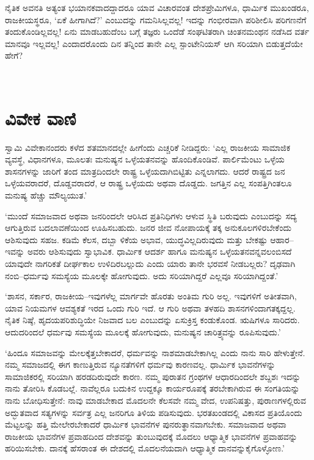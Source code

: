 ನೈತಿಕ ಅವನತಿ ಅತ್ಯಂತ ಭಯಾನಕವಾದದ್ದಾದರೂ ಯಾವ ವಿಚಾರವಂತ ದೇಶಪ್ರೇಮಿಗಳೂ, ಧಾರ್ಮಿಕ ಮುಖಂಡರೂ, ರಾಜಕೀಯಸ್ಥರೂ, ‘ಏಕೆ ಹೀಗಾಗಿದೆ?’ ಎಂಬುದನ್ನು ಗಮನಿ\-ಸಿಲ್ಲ\-ವಲ್ಲ! ಇದನ್ನು ಗಂಭೀರವಾಗಿ ಪರಿಶೀಲಿಸಿ ಪರಿಗಣನೆಗೆ ತಂದುಕೊಂಡಿಲ್ಲವಲ್ಲ! ಏನು ಮಾಡ\-ಬಹುದೆಂಬ ಬಗ್ಗೆ ತಜ್ಞರು ಒಂದೆಡೆ ಸಂಘಟಿತರಾಗಿ ಚಿಂತನಮಂಥನ ನಡೆಸಿದ ವರ್ತ ಮಾನವೂ ಇಲ್ಲವಲ್ಲ! ಎಂದಾದರೊಂದು ದಿನ ತನ್ನಿಂದ ತಾನೇ ಎಲ್ಲ ಸ್ಪಾಂಟೇನಿಯಸ್ ಆಗಿ ಸರಿಯಾಗಿ ಬಿಡುತ್ತದೆಯೇ ಹೇಗೆ?

~\\[-1.45cm]


\section*{ವಿವೇಕ ವಾಣಿ}

\vskip -6pt

ಸ್ವಾಮಿ ವಿವೇಕಾನಂದರು ಕಳೆದ ಶತಮಾನದಲ್ಲೇ ಹೀಗೆಂದು ಎಚ್ಚರಿಕೆ ನೀಡಿದ್ದರು: ‘ಎಲ್ಲ ರಾಜ\-ಕೀಯ ಸಾಮಾಜಿಕ ವ್ಯವಸ್ಥೆ, ವಿಧಾನಗಳೂ, ಮೂಲತಃ ಮನುಷ್ಯನ ಒಳ್ಳೆಯತನವನ್ನು ಹೊಂದಿ\-ಕೊಂಡಿವೆ. ಪಾರ್ಲಿಮೆಂಟು ಒಳ್ಳೆಯ ಶಾಸನಗಳನ್ನು ಜಾರಿಗೆ ತಂದ ಮಾತ್ರದಿಂದಲೇ ರಾಷ್ಟ್ರ ಒಳ್ಳೆಯದಾಗಿಬಿಟ್ಟಿತು ಎನ್ನಲಾಗದು. ಆದರೆ ರಾಷ್ಟ್ರದ ಜನ ಒಳ್ಳೆಯವರಾದರೆ, ದೊಡ್ಡವ\-ರಾದರೆ, ಆ ರಾಷ್ಟ್ರ ಒಳ್ಳೆಯದು ಅಥವಾ ದೊಡ್ಡದು. ಜಗತ್ತಿನ ಎಲ್ಲ ಸಂಪತ್ತಿಗಿಂತಲೂ ಮನುಷ್ಯ ಹೆಚ್ಚು ಮೌಲ್ಯಯುತ.’

‘ಮುಂದೆ ಸಮಾಜವಾದ ಅಥವಾ ಜನರಿಂದಲೇ ಆರಿಸಿದ ಪ್ರತಿನಿಧಿಗಳು ಆಳುವ ಸ್ಥಿತಿ ಬರುವುದು ಎಂಬುದನ್ನು ಸದ್ಯ ಆಗುತ್ತಿರುವ ಬದಲಾವಣೆಯಿಂದ ಊಹಿಸಬಹುದು. ಜನರ ಜೀವ ನೋಪಾಯಕ್ಕೆ ತಕ್ಕ ಅನುಕೂಲಗಳಿರಬೇಕೆಂದು ಆಶಿಸುವುದು ಸಹಜ. ಕಡಿಮೆ ಕೆಲಸ, ದಬ್ಬಾ ಳಿಕೆಯ ಅಭಾವ, ಯುದ್ಧವಿಲ್ಲದಿರುವುದು ಮತ್ತು ಬೇಕಷ್ಟು ಆಹಾರ–ಇವನ್ನು ಅವರು ಆಶಿಸುವುದು ಸ್ವಾಭಾವಿಕ. ಧಾರ್ಮಿಕ ಆದರ್ಶ ಹಾಗೂ ಮನುಷ್ಯನ ಒಳ್ಳೆಯತನವನ್ನವಲಂಬಿಸದೆ ಯಾವುದೇ ನಾಗರಿಕತೆ ದೀರ್ಘಕಾಲ ಉಳಿದಿರಬಲ್ಲುದು ಎಂದು ಯಾರು ತಾನೇ ಭರವಸೆ ನೀಡಬಲ್ಲರು? ದೃಢವಾಗಿ ನಂಬಿ–ಧರ್ಮವು ಸಮಸ್ಯೆಯ ಮೂಲಕ್ಕೇ ಹೋಗುವುದು. ಅದು ಸರಿಯಾಗಿದ್ದರೆ ಎಲ್ಲವೂ ಸರಿಯಾಗಿದ್ದಂತೆ.’

‘ಶಾಸನ, ಸರ್ಕಾರ, ರಾಜಕೀಯ–ಇವುಗಳೆಲ್ಲ ಮಾರ್ಗವೇ ಹೊರತು ಅಂತಿಮ ಗುರಿ ಅಲ್ಲ. ಇವುಗಳಿಗೆ ಅತೀತವಾಗಿ, ಯಾವ ನಿಯಮಗಳ ಆವಶ್ಯಕತೆ ಇರದ ಒಂದು ಗುರಿ ಇದೆ. ಆ ಗುರಿ ಅಥವಾ ತಳಹದಿ ಶಾಸನಗಳಿಂದಾಗತಕ್ಕದ್ದಲ್ಲ. ನೈತಿಕ ನಿಷ್ಠೆ, ಹೃದಯಪರಿಶುದ್ಧಿಯೇ ನಿಜವಾದ ಬಲ ಎಂಬುದನ್ನು ಏಸುಕ್ರಿಸ್ತ ಕಂಡುಕೊಂಡ. ಋಷಿಗಳೂ ಸಾರಿದರು. ಆದುದರಿಂದಲೆ ಧರ್ಮವು ಸಮಸ್ಯೆಯ ಮೂಲಕ್ಕೆ ಹೋಗುವುದು, ಮನುಷ್ಯನ ಚಾರಿತ್ರ್ಯವನ್ನು ರೂಪಿಸುವುದು.’

‘ಹಿಂದೂ ಸಮಾಜವನ್ನು ಮೇಲಕ್ಕೆತ್ತಬೇಕಾದರೆ, ಧರ್ಮವನ್ನು ನಾಶಮಾಡಬೇಕಾಗಿಲ್ಲ ಎಂದು ನಾನು ಸಾರಿ ಹೇಳುತ್ತೇನೆ. ನಮ್ಮ ಸಮಾಜದಲ್ಲಿ ಈಗ ಕಾಣುತ್ತಿರುವ ನ್ಯೂನತೆಗಳಿಗೆ ಧರ್ಮವು ಕಾರಣವಲ್ಲ. ಧಾರ್ಮಿಕ ಭಾವನೆಗಳನ್ನು ಸಾಮಾಜಿಕರಲ್ಲಿ ಸರಿಯಾಗಿ ಹರಡದಿರುವುದೇ ಕಾರಣ. ನಮ್ಮ ಪುರಾತನ ಗ್ರಂಥಗಳ ಆಧಾರದಿಂದಲೇ ಶಬ್ದಶಃ ಇದನ್ನು ನಾನು ತೋರಿಸಿ ಕೊಡಬಲ್ಲೆ. ನಾವೆಲ್ಲರೂ ಬದುಕಿನ ಉದ್ದಕ್ಕೂ ಕಾರ್ಯರೂಪಕ್ಕೆ ತರಬೇಕಾಗಿರುವ ಈ ಸಂಗತಿಯನ್ನು ನಾನು ಬೋಧಿಸುತ್ತೇನೆ: ನಾವು ಮಾಡಬೇಕಾದ ಮೊದಲನೇ ಕೆಲಸವೇ ನಮ್ಮ ವೇದ, ಉಪನಿಷತ್ತು, ಪುರಾಣಗಳಲ್ಲಿರುವ ಅದ್ಭುತವಾದ ಸತ್ಯಗಳನ್ನು ಸರ್ವತ್ರ ಎಲ್ಲ ಜನರಿಗೂ ತಿಳಿಯ ಪಡಿಸುವುದು. ಭರತಖಂಡದಲ್ಲಿ ವಿಕಾಸದ ಪ್ರತಿಯೊಂದು ಮೆಟ್ಟಲನ್ನು ಹತ್ತಿ ಮೇಲೇರಬೇಕಾದರೆ ಧಾರ್ಮಿಕ ಭಾವನೆಗಳ ಪುನರುತ್ಥಾನವಾಗಬೇಕು. ಸಮಾಜವಾದ ಅಥವಾ ರಾಜಕೀಯ ಭಾವನೆಗಳ ಪ್ರವಾಹದಿಂದ ದೇಶವನ್ನು ತುಂಬುವುದಕ್ಕೆ ಮೊದಲು ಆಧ್ಯಾತ್ಮಿಕ ಭಾವನೆಗಳ ಪ್ರವಾಹವನ್ನು ಹರಿಯಿಸಬೇಕು. ದಾನಕ್ಕೆ ಹೆಸರಾಂತ ಈ ದೇಶದಲ್ಲಿ ಮೊದಲನೆಯದಾಗಿ ಆಧ್ಯಾತ್ಮಿಕ ದಾನವನ್ನು\break ಕೈಗೊಳ್ಳೋಣ.’


